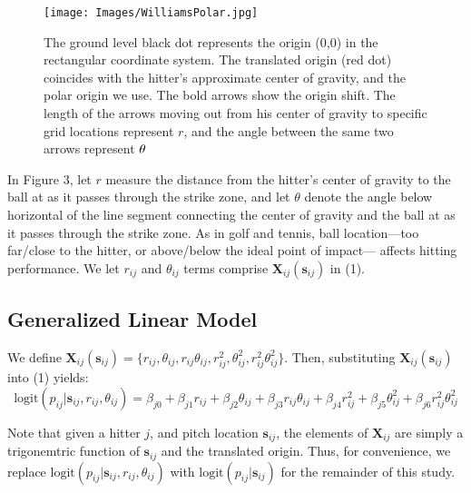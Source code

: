 
  \begin{figure}[H]
	\centering
	\texttt{[image: Images/WilliamsPolar.jpg]}
	\caption{The ground level black dot represents the origin (0,0) in the rectangular coordinate system. The translated origin (red dot) coincides with the hitter's approximate center of gravity, and the polar origin we use. The bold arrows show the origin shift. The length of the arrows moving out from his center of gravity to specific grid locations represent $r$, and the angle between the same two arrows represent $\protect\theta$}
	\end{figure}
In Figure 3, let $r$ measure the distance from the hitter's center of gravity to the ball at as it passes through the strike zone, and let $\theta$ denote the angle below horizontal of the line segment connecting the center of gravity and the ball at as it passes through the strike zone. As in golf and tennis, ball location---too far/close to the hitter, or above/below the ideal point of impact--- affects hitting performance. We let $r_{ij}$ and $\theta_{ij}$ terms comprise $\pmb{X}_{ij}(\pmb{s}_{ij})$ in (1).

\subsection{Generalized Linear Model} %

We define $\pmb{X}_{ij}(\pmb{s}_{ij}) = \{r_{ij}, \theta_{ij}, r_{ij}\theta_{ij}, r_{ij}^{2}, \theta_{ij}^{2}, r_{ij}^{2}\theta_{ij}^{2}\}$. Then, substituting $\pmb{X}_{ij}(\pmb{s}_{ij})$ into (1) yields:
\begin{equation}
\text{logit}(p_{ij}|\pmb{s}_{ij}, r_{ij}, \theta_{ij}) = \beta_{j0} + \beta_{j1}r_{ij} + \beta_{j2} \theta_{ij} + \beta_{j3} r_{ij} \theta_{ij} + \beta_{j4}r_{ij}^{2} + \beta_{j5} \theta_{ij}^{2} + \beta_{j6} r_{ij}^{2} \theta_{ij}^{2}
\end{equation}

Note that given a hitter $j$, and pitch location $\pmb{s}_{ij}$, the elements of $\pmb{X}_{ij}$ are simply a trigonemtric function of $\pmb{s}_{ij}$ and the translated origin. Thus, for convenience, we replace $\text{logit}(p_{ij}|\pmb{s}_{ij}, r_{ij}, \theta_{ij})$ with $\text{logit}(p_{ij}|\pmb{s}_{ij})$ for the remainder of this study.

